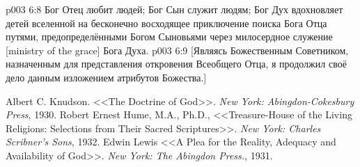 \vs p003 6:8 \pc Бог Отец любит людей; Бог Сын служит людям; Бог Дух вдохновляет детей вселенной на бесконечно восходящее приключение поиска Бога Отца путями, предопределёнными Богом Сыновьями через милосердное служение [ministry of the grace] Бога Духа.
\vsetoff
\vs p003 6:9 [Являясь Божественным Советником, назначенным для представления откровения Всеобщего Отца, я продолжил своё дело данным изложением атрибутов Божества.]
\quizlink
\begin{thebibliography}{100}
Albert C. Knudson.
{<<The Doctrine of God>>.}
{\em New York: Abingdon-Cokesbury Press}, 1930.
Robert Ernest Hume, M.A., Ph.D.,
{<<Treasure\hyp{}House of the Living Religions: Selections from Their Sacred Scriptures>>.}
{\em New York: Charles Scribner's Sons}, 1932.
Edwin Lewis
{<<A Plea for the Reality, Adequacy and Availability of God>>.}
{\em New York: The Abingdon Press.}, 1931.
\end{thebibliography}
